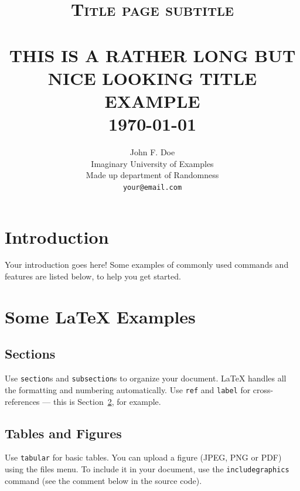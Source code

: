 \documentclass[paper=a4, fontsize=11pt,twoside]{scrartcl}	%
\title{	\normalsize \textsc{Title page subtitle} 	%
		 	\\[2.0cm]								%
			\HRule{0.5pt} \\						%
			\LARGE \textbf{\uppercase{This is a rather long but nice looking title example}}	%
			\HRule{2pt} \\ [0.5cm]		%
			\normalsize \today			%
		}
\author{
		John F. Doe\\	
		Imaginary University of Examples\\	
		Made up department of Randomness\\
        \texttt{your@email.com} \\
}
\makeatletter
\def\printtitle{%
    {\centering \@title\par}}
\def\printauthor{%
    {\centering \large \@author}}
\makeatother
\begin{document}
\thispagestyle{empty}		%

\printtitle					%
  	\vfill
\printauthor				%
\newpage
\setcounter{page}{1}		%
\section{Introduction}

Your introduction goes here! Some examples of commonly used commands and features are listed below, to help you get started.

\section{Some \LaTeX{} Examples}
\label{sec:examples}

\subsection{Sections}

Use \texttt{section}s and \texttt{subsection}s to organize your document. \LaTeX{} handles all the formatting and numbering automatically. Use \texttt{ref} and \texttt{label} for cross-references --- this is Section~\ref{sec:examples}, for example.

\subsection{Tables and Figures}

Use \texttt{tabular} for basic tables. You can upload a figure (JPEG, PNG or PDF) using the files menu. To include it in your document, use the \texttt{includegraphics} command (see the comment below in the source code).

\end{document}
